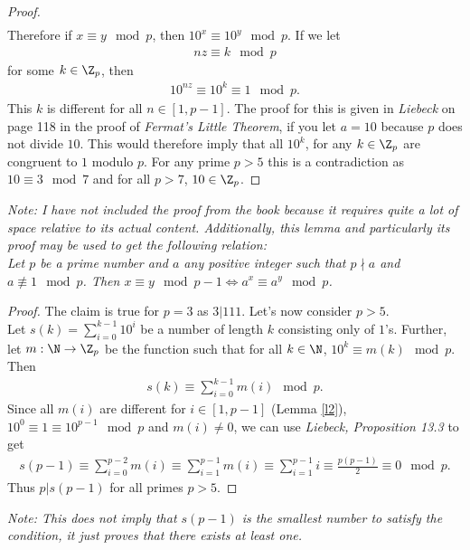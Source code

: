 \documentclass{article}
\begin{document}
\begin{adjustwidth}{2em}{2em}
\begin{proof}
\begin{align*}
		\end{align*}
		Therefore if $x\equiv y \mod p$, then $10^x\equiv 10^y\mod p$. If we let
		\begin{align*}
			nz \equiv k \mod p
		\end{align*}
		for some $k\in\Z_p$, then
		\begin{align*}
			10^{nz}\equiv 10^{k} \equiv 1 \mod p.
		\end{align*}
		This $k$ is different for all $n\in[1,p-1]$. The proof for this is given in \emph{Liebeck} on page 118 in the proof of \emph{Fermat's Little Theorem}, if you let $a=10$ because $p$ does not divide $10$. This would therefore imply that all $10^k$, for any $k\in\Z_p$ are congruent to $1$ modulo $p$. For any prime $p>5$ this is a contradiction as $10\equiv 3 \mod 7$ and for all $p>7$, $10\in\Z_p$.
	\end{proof}
	\emph{Note: I have not included the proof from the book because it requires quite a lot of space relative to its actual content.
		Additionally, this lemma and particularly its proof may be used to get the following relation:\\
		Let $p$ be a prime number and $a$ any positive integer such that $p\nmid a$ and $a\not\equiv 1 \mod p$. Then $x\equiv y \mod p-1 \Leftrightarrow a^x\equiv a^y \mod p$.}
\end{adjustwidth}
\begin{proof}
	The claim is true for $p=3$ as $3|111$. Let's now consider $p>5$.\\
	Let $s(k)=\sum_{i=0}^{k-1} 10^i$ be a number of length $k$ consisting only of $1$'s.
	Further, let $m:\N\to\Z_p$ be the function such that for all $k\in\N$, $10^k\equiv m(k)\mod p$. Then
	\begin{align*}
		s(k) \equiv \sum_{i=0}^{k-1} m(i) \mod p.
	\end{align*}
	Since all $m(i)$ are different for $i\in[1,p-1]$ (Lemma \ref{l2}), $10^0\equiv 1\equiv 10^{p-1}\mod p$ and $m(i)\not=0$, we can use \emph{Liebeck, Proposition 13.3} to get
	\begin{align*}
		s(p-1)
		\equiv \sum_{i=0}^{p-2}m(i)
		\equiv \sum_{i=1}^{p-1}m(i)
		\equiv \sum_{i=1}^{p-1} i
		\equiv \frac{p(p-1)}{2}
		\equiv 0 \mod p.
	\end{align*}
	Thus $p|s(p-1)$ for all primes $p>5$.
\end{proof}
\emph{Note: This does not imply that $s(p-1)$ is the smallest number to satisfy the condition, it just proves that there exists at least one.}
\end{document}
